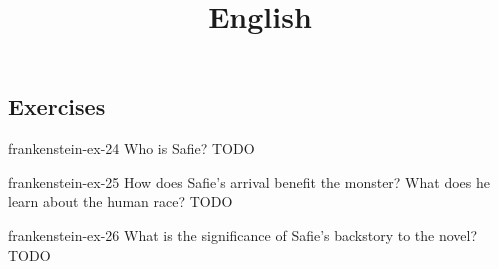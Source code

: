 \documentclass[preview]{standalone}
\begin{document}
\title{English}
\genpage

\subsection{Exercises}

\begin{snippetexercise}{frankenstein-ex-24}
    {Who is Safie?}
    TODO 
\end{snippetexercise}

\begin{snippetexercise}{frankenstein-ex-25}
    {How does Safie's arrival benefit the monster? What does he learn about the human race?}
    TODO 
\end{snippetexercise}

\begin{snippetexercise}{frankenstein-ex-26}
    {What is the significance of Safie's backstory to the novel?}
    TODO 
\end{snippetexercise}
\end{document}
